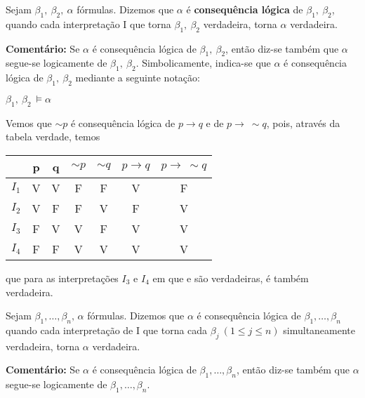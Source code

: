\begin{defi}
    Sejam $\beta_1,\ \beta_2,\ \alpha$ fórmulas.
    Dizemos que $\alpha$ é \textbf{consequência lógica} de $\beta_1,\ \beta_2$, quando cada interpretação I que torna $\beta_1,\ \beta_2$ verdadeira, torna $\alpha$ verdadeira.
\end{defi}

\bigskip
\noindent
\textbf{Comentário:} Se $\alpha$ é consequência lógica de $\beta_1,\ \beta_2$, então diz-se também que $\alpha$ segue-se logicamente de $\beta_1,\ \beta_2$.
Simbolicamente, indica-se que $\alpha$ é consequência lógica de $\beta_1,\ \beta_2$ mediante a seguinte notação:

\centerline{$\beta_1,\ \beta_2\ \vDash \alpha$} %

\begin{exemplo}
    Vemos que $\sim p$ é consequência lógica de $p \to q$ e de $p \to\ \sim q$, pois, através da tabela verdade, temos
\end{exemplo}

\begin{center}
    \begin{tabular}{c | c c c c c c}
              & p & q & $\sim p$ & $\sim q$ & $p \to q$ & $p \to\ \sim q$ \\ \hline
        $I_1$ & V & V & F        & F        & V         & F \\
        $I_2$ & V & F & F        & V        & F         & V \\
        $I_3$ & F & V & V        & F        & V         & V \\
        $I_4$ & F & F & V        & V        & V         & V \\
    \end{tabular}
\end{center}
que para as interpretações $I_3$ e $I_4$ em que  e  são verdadeiras,  é também verdadeira.

\begin{defi}
    Sejam $\beta_1, \dots, \beta_n,\, \alpha$ fórmulas.
    Dizemos que $\alpha$ é consequência lógica de $\beta_1,\dots, \beta_n$ quando cada interpretação de I que torna cada $\beta_j\ (1 \leq j \leq n)$ simultaneamente verdadeira, torna $\alpha$ verdadeira.
\end{defi}

\bigskip
\noindent
\textbf{Comentário:} Se $\alpha$ é consequência lógica de $\beta_1,\dots, \beta_n$, então diz-se também que $\alpha$ segue-se logicamente de $\beta_1,\dots, \beta_n$.

